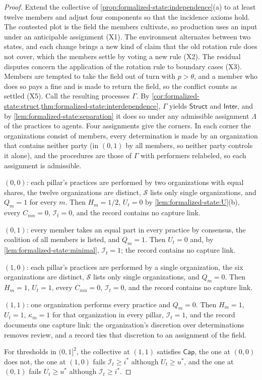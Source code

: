 \documentclass[11pt,letterpaper]{article}
\theoremstyle{definition}
\theoremstyle{remark}
\newcommand{\Integ}{\mathcal{I}}
\newcommand{\Struct}{\mathsf{Struct}}
\newcommand{\Inter}{\mathsf{Inter}}
\newcommand{\Capt}{\mathsf{Cap}}
\begin{document}
\begin{proof}
Extend the collective of \cref{prop:formalized-state:independence}(a) to at least twelve members and adjust four components so that the incidence axioms hold. The contested plot is the field the members cultivate, so production uses an input under an anticipable assignment (X1). The environment alternates between two states, and each change brings a new kind of claim that the old rotation rule does not cover, which the members settle by voting a new rule (X2). The residual disputes concern the application of the rotation rule to boundary cases (X3). Members are tempted to take the field out of turn with $p>\theta$, and a member who does so pays a fine and is made to return the field, so the conflict counts as settled (X5). Call the resulting processes $\Gamma$. By \cref{cor:formalized-state:struct,thm:formalized-state:interdependence}, $\Gamma$ yields $\Struct$ and $\Inter$, and by \cref{lem:formalized-state:separation} it does so under any admissible assignment $\Lambda$ of the practices to agents. Four assignments give the corners. In each corner the organizations consist of members, every determination is made by an organization that contains neither party (in $(0,1)$ by all members, so neither party controls it alone), and the procedures are those of $\Gamma$ with performers relabeled, so each assignment is admissible.

$(0,0)$: each pillar's practices are performed by two organizations with equal shares, the twelve organizations are distinct, $\mathcal{S}$ lists only single organizations, and $Q_m=1$ for every $m$. Then $H_m=1/2$, $U_t=0$ by \cref{lem:formalized-state:U}(b), every $C_{mn}=0$, $\Integ_t=0$, and the record contains no capture link.

$(0,1)$: every member takes an equal part in every practice by consensus, the coalition of all members is listed, and $Q_m=1$. Then $U_t=0$ and, by \cref{lem:formalized-state:minimal}, $\Integ_t=1$; the record contains no capture link.

$(1,0)$: each pillar's practices are performed by a single organization, the six organizations are distinct, $\mathcal{S}$ lists only single organizations, and $Q_m=0$. Then $H_m=1$, $U_t=1$, every $C_{mn}=0$, $\Integ_t=0$, and the record contains no capture link.

$(1,1)$: one organization performs every practice and $Q_m=0$. Then $H_m=1$, $U_t=1$, $\kappa_m=1$ for that organization in every pillar, $\Integ_t=1$, and the record documents one capture link: the organization's discretion over determinations removes review, and a record ties that discretion to an assignment of the field.

For thresholds in $(0,1]^2$, the collective at $(1,1)$ satisfies $\Capt$, the one at $(0,0)$ does not, the one at $(1,0)$ fails $\Integ_t\ge i^{*}$ although $U_t\ge u^{*}$, and the one at $(0,1)$ fails $U_t\ge u^{*}$ although $\Integ_t\ge i^{*}$.
\end{proof}
\end{document}
